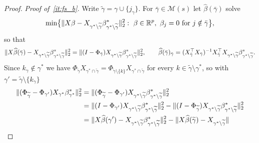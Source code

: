 \begin{proof}
    \emph{Proof of~\ref{it:fs_b}.} Write
    $\widetilde\gamma=\gamma\cup\{j_\gamma\}$. For
    $\bar\gamma\in\mathscr{M}(s)$ let $\widehat\beta(\bar\gamma)$ solve
    \begin{equation}
        \label{eq:modLS}
        \min\bigl\{\lVert X\beta
        -X_{\gamma^{\ast}\setminus\widetilde\gamma}
            \beta^\ast_{\gamma^{\ast}\setminus\widetilde\gamma}\rVert_2^{2}:\
        \beta\in\mathbb{R}^{p},\ \beta_j=0\ \text{for }j\notin\bar\gamma\bigr\},
    \end{equation}
    so that
    \begin{equation}
        \label{eq:LSid}
        \lVert X\widehat\beta(\bar\gamma)
        -X_{\gamma^{\ast}\setminus\widetilde\gamma}
            \beta^\ast_{\gamma^{\ast}\setminus\widetilde\gamma}\rVert_2^{2}
        =\lVert(I-\Phi_{\bar\gamma})
            X_{\gamma^{\ast}\setminus\widetilde\gamma}
            \beta^\ast_{\gamma^{\ast}\setminus\widetilde\gamma}\rVert_2^{2},
        \qquad
        \widehat\beta(\bar\gamma)_{\bar\gamma}
        =(X_{\bar\gamma}^{\top}X_{\bar\gamma})^{-1}X_{\bar\gamma}^{\top}
        X_{\gamma^{\ast}\setminus\widetilde\gamma}
        \beta^\ast_{\gamma^{\ast}\setminus\widetilde\gamma} .
    \end{equation}
    Since
    $k_\gamma\notin\gamma^\ast$ we have
    $\Phi_{\widetilde\gamma}X_{\gamma^{\ast}\cap\widetilde\gamma}
    =\Phi_{\widetilde\gamma\setminus\{k\}}
    X_{\gamma^{\ast}\cap\widetilde\gamma}$ for every
    $k\in\widetilde\gamma\setminus\gamma^{\ast}$, so with
    $\gamma'=\widetilde\gamma\setminus\{k_\gamma\}$
    \begin{align}
        \notag
        \lVert(\Phi_{\widetilde\gamma}-\Phi_{\gamma'})
            X_{\gamma^{\ast}}\beta^{\ast}_{\gamma^{\ast}}\rVert_2^{2}
        &=\lVert(\Phi_{\widetilde\gamma}-\Phi_{\gamma'})
            X_{\gamma^{\ast}\setminus\widetilde\gamma}
            \beta^\ast_{\gamma^{\ast}\setminus\widetilde\gamma}\rVert_2^{2}\\
        \notag
        &=\lVert(I-\Phi_{\gamma'})
            X_{\gamma^{\ast}\setminus\widetilde\gamma}
            \beta^\ast_{\gamma^{\ast}\setminus\widetilde\gamma}\rVert_2^{2}
        -\lVert(I-\Phi_{\widetilde\gamma})
            X_{\gamma^{\ast}\setminus\widetilde\gamma}
            \beta^\ast_{\gamma^{\ast}\setminus\widetilde\gamma}\rVert_2^{2}\\
        \label{eq:LSdiff}
        &=\lVert X\widehat\beta(\gamma')
        -X_{\gamma^{\ast}\setminus\widetilde\gamma}
            \beta^\ast_{\gamma^{\ast}\setminus\widetilde\gamma}\rVert_2^{2}
        -\lVert X\widehat\beta(\widetilde\gamma)
        -X_{\gamma^{\ast}\setminus\widetilde\gamma}
\rVert
\end{align}
\end{proof}
